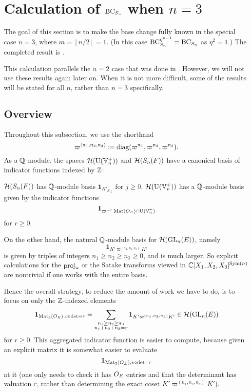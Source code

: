 \section{Calculation of $\operatorname{BC}_{S_n}$ when $n = 3$}
The goal of this section is to make the base change
fully known in the special case $n = 3$, where $m = \left\lfloor n/2 \right\rfloor = 1$.
(In this case $\operatorname{BC}_{S_n}^{\eta^{n-1}} = \operatorname{BC}_{S_n}$ as $\eta^2 = 1$.)
The completed result is .

This calculation parallels the $n = 2$ case that was done in \cite[Lemma 7.1.1]{ref:AFLspherical}.
However, we will not use these results again later on.
When it is not more difficult, some of the results will be stated for all $n$,
rather than $n = 3$ specifically.

\subsection{Overview}
Throughout this subsection, we use the shorthand
\[ \varpi^{(n_1, n_2, n_3)} \coloneqq \operatorname{diag}(\varpi^{n_1}, \varpi^{n_2}, \varpi^{n_3}). \]
As a $\mathbb Q$-module, the spaces $\mathcal H(\operatorname{U}(\mathbb V_n^+))$ and $\mathcal H(S_n(F))$
have a canonical basis of indicator functions indexed by $\mathbb Z$:
\begin{itemize}
  \ii $\mathcal H(S_n(F))$ has $\mathbb Q$-module basis $\mathbf{1}_{K'_{S,j}}$ for $j \ge 0$.
  \ii $\mathcal H(\operatorname{U}(\mathbb V_n^+))$ has a $\mathbb Q$-module basis given by the indicator functions
  \[ \mathbf{1}_{\varpi^{-r} \operatorname{Mat}(O_E) \cap \operatorname{U}(\mathbb V_n^+)} \]
  for $r \ge 0$.
\end{itemize}
On the other hand, the natural $\mathbb Q$-module basis for $\mathcal H(\operatorname{GL}_n(E))$, namely
\[ \mathbf{1}_{K'\varpi^{(n_1, n_2, n_3)}K'} \]
is given by triples of integers $n_1 \ge n_2 \ge n_3 \ge 0$, and is much larger.
So explicit calculations for the $\operatorname{proj}_\ast$ or the Satake transforms viewed in
$\mathbb C[X_1, X_2, X_3]^{\operatorname{Sym}(n)}$ are nontrivial if one works with the entire basis.

Hence the overall strategy, to reduce the amount of work we have to do,
is to focus on only the $\mathbb Z$-indexed elements
\[
  \mathbf{1}_{\operatorname{Mat}_3(O_E), v\circ\det=r}
  = \sum_{\substack{n_1 \ge n_2 \ge n_3 \\ n_1 + n_2 + n_3 = r}}
  \mathbf{1}_{K'\varpi^{(n_1, n_2, n_3)}K'} \in \mathcal H(\operatorname{GL}_n(E))
\]
for $r \ge 0$.
This aggregated indicator function is easier to compute,
because given an explicit matrix it is somewhat easier
to evaluate \[ \mathbf{1}_{\operatorname{Mat}_3(O_E), v\circ\det=r} \]
at it (one only needs to check it has $O_E$ entries
and that the determinant has valuation $r$,
rather than determining the exact coset $K'\varpi^{(n_1, n_2, n_3)}K'$).


